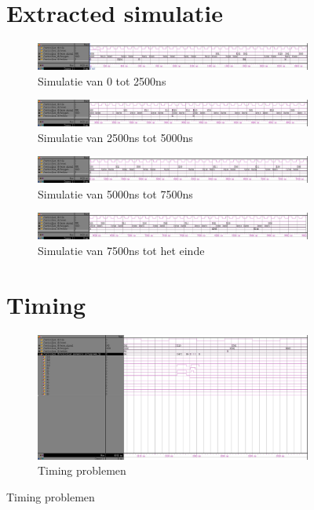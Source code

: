 \begin{figure}[ht!]
\section{Extracted simulatie}
\begin{figure}[ht!]
\includegraphics[width=\textwidth,height=\textheight,keepaspectratio]{Figuren/Controller/wave0-2_5_ext_inv.jpg}
\caption{Simulatie van 0 tot 2500ns}
\label{fig:sim_ext_0-2_5}
\end{figure}
\begin{figure}[ht!]
\includegraphics[width=\textwidth,height=\textheight,keepaspectratio]{Figuren/Controller/wave2_5-5_ext_inv.jpg}
\caption{Simulatie van 2500ns tot 5000ns}
\label{fig:sim_ext_2_5-5}
\end{figure}
\begin{figure}[ht!]
\includegraphics[width=\textwidth,height=\textheight,keepaspectratio]{Figuren/Controller/wave5-7_5_ext_inv.jpg}
\caption{Simulatie van 5000ns tot 7500ns}
\label{fig:sim_ext_5-7_5}
\end{figure}
\begin{figure}[ht!]
\includegraphics[width=\textwidth,height=\textheight,keepaspectratio]{Figuren/Controller/wave7_5-_ext_inv.jpg}
\caption{Simulatie van 7500ns tot het einde}
\label{fig:sim_ext_7_5-}
\end{figure}
\newpage
\section{Timing}
\begin{figure}[ht!]
\includegraphics[width=\textwidth,height=\textheight,keepaspectratio]{Figuren/Controller/gliches_min_inv.jpg}
\caption{Timing problemen}
\label{fig:timing_controller}
\end{figure}


\end{figure}
